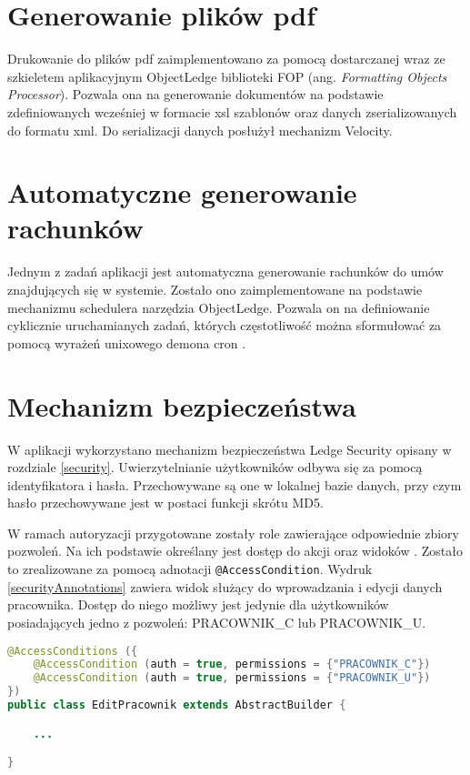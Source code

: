 \section[Generowanie plików pdf][Generowanie plików pdf]{Generowanie plików pdf}
Drukowanie do plików pdf zaimplementowano za pomocą dostarczanej wraz ze szkieletem aplikacyjnym ObjectLedge biblioteki FOP (ang. \textit{Formatting Objects Processor}). Pozwala ona na generowanie dokumentów na podstawie zdefiniowanych wcześniej w formacie xsl szablonów oraz danych zserializowanych do formatu xml. Do serializacji danych posłużył mechanizm Velocity.

\section[Automatyczne generowanie rachunków][Automatyczne generowanie rachunków]{Automatyczne generowanie rachunków}
Jednym z zadań aplikacji jest automatyczna generowanie rachunków do umów znajdujących się w systemie. Zostało ono zaimplementowane na podstawie mechanizmu schedulera narzędzia ObjectLedge. Pozwala on na definiowanie cyklicznie uruchamianych zadań, których częstotliwość można sformułować za pomocą wyrażeń unixowego demona cron \cite{cron}. 

\section[Mechanizm bezpieczeństwa][Mechanizm bezpieczeństwa]{Mechanizm bezpieczeństwa}
W aplikacji wykorzystano mechanizm bezpieczeństwa Ledge Security opisany w rozdziale \ref{security}. Uwierzytelnianie użytkowników odbywa się za pomocą identyfikatora i hasła. Przechowywane są one w lokalnej bazie danych, przy czym hasło przechowywane jest w postaci funkcji skrótu MD5. 

W ramach autoryzacji przygotowane zostały role zawierające odpowiednie zbiory pozwoleń. Na ich podstawie określany jest dostęp do akcji oraz widoków . Zostało to zrealizowane za pomocą adnotacji \texttt{@AccessCondition}. Wydruk \ref{securityAnnotations} zawiera widok służący do wprowadzania i edycji danych pracownika. Dostęp do niego możliwy jest jedynie dla użytkowników posiadających jedno z pozwoleń: PRACOWNIK\_C lub PRACOWNIK\_U.

\begin{lstlisting}[language=Java,style=outcode,showstringspaces=false,caption=Dostęp do widoku edycji danych pracownika zabezpieczony za pomocą adnotacji,label={securityAnnotations}]
@AccessConditions ({
	@AccessCondition (auth = true, permissions = {"PRACOWNIK_C"})
	@AccessCondition (auth = true, permissions = {"PRACOWNIK_U"})
})
public class EditPracownik extends AbstractBuilder {

	...

}
\end{lstlisting}


